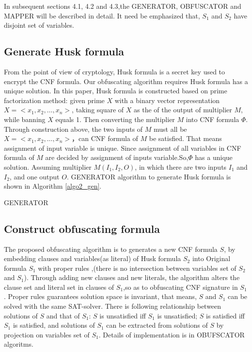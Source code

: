 \documentclass[runningheads,a4paper]{llncs}
\begin{document}
In subsequent sections 4.1, 4.2 and 4.3,the GENERATOR, OBFUSCATOR and MAPPER will be described in detail. 
It need be emphasized that, $S_1$  and $S_2$ have disjoint set of variables.

\subsection{Generate Husk formula}
From the point of view of cryptology, Husk formula is a secret key used to encrypt the CNF formula. 
Our obfuscating algorithm requires Husk formula has a unique solution.
In this paper, Husk formula is constructed based on prime factorization method:
given prime $X$ with a binary vector representation $X = <x_1,x_2,\dots,x_n>$, 
taking square of $X$ as the of the output of multiplier $M$, while banning $X$ equals 1.
Then converting the multiplier $M$ into CNF formula $\Phi$.
Through construction above, the two inputs of $M$ must all be $X = <x_1,x_2,\dots,x_n>$，can CNF formula of $M$ be satisfied.
That means assignment of input variable is unique.
Since assignment of all variables in CNF formula of $M$ are decided by assignment of inputs variable.So,$\Phi$ has a unique solution. 
Assuming multiplier $M (I_1, I_2, O)$, in which there are two inputs $I_1$ and $I_2$, and one output $O$.
GENERATOR algorithm to generate Husk formula is shown in Algorithm \ref{algo2_gen}.

\begin{algorithm}[b]
\SetAlgoLined
{}
\caption{GENERATOR}
\label{algo2_gen}
\end{algorithm}


\subsection{Construct obfuscating formula}

The proposed obfuscating algorithm is to generates a new CNF formula $S$, 
by embedding clauses and variables(as literal) of Husk formula $S_2$ into Original formula $S_1$ with proper rules ,(there is no intersection between variables set of $S_2$ and $S_1$). 
Through adding new clauses and new literals, the algorithm alters the clause set and literal set in clauses of $S_1$,so as to obfuscating CNF signature in $S_1$.
Proper rules guarantees solution space is invariant, that means, $S$ and $S_1$ can be solved with the same SAT-solver.
There is following relationship between solutions of $S$ and that of $S_1$: $S$ is unsatisfied iff $S_1$ is unsatisfied;
$S$ is satisfied iff $S_1$ is satisfied, and solutions of $S_1$ can be extracted from solutions of $S$ by projection on variables set of $S_1$.
Details of implementation is in OBUFSCATOR algoritms.
\end{document}

